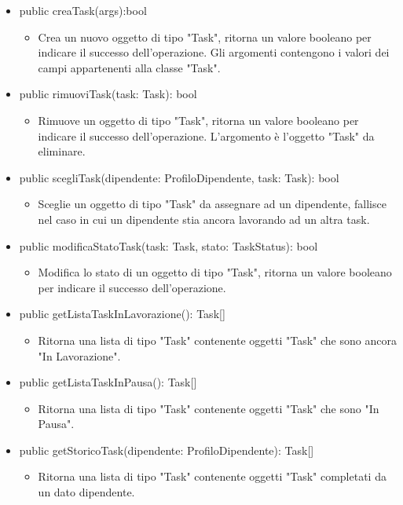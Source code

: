 \documentclass{report}
\begin{document}
\begin{itemize}
\item public creaTask(args):bool
\begin{itemize}
    \item Crea un nuovo oggetto di tipo "Task", ritorna un valore booleano per indicare il successo dell'operazione. Gli argomenti contengono i valori dei campi appartenenti alla classe "Task". 
\end{itemize}
\item public rimuoviTask(task: Task): bool
\begin{itemize}
    \item Rimuove un oggetto di tipo "Task", ritorna un valore booleano per indicare il successo dell'operazione. L'argomento è l'oggetto "Task" da eliminare.
\end{itemize}
\item public scegliTask(dipendente: ProfiloDipendente, task: Task): bool
\begin{itemize}
    \item Sceglie un oggetto di tipo "Task" da assegnare ad un dipendente, fallisce nel caso in cui un dipendente stia ancora lavorando ad un altra task.
\end{itemize}
\item public modificaStatoTask(task: Task, stato: TaskStatus): bool
\begin{itemize}
    \item Modifica lo stato di un oggetto di tipo "Task", ritorna un valore booleano per indicare il successo dell'operazione.
\end{itemize}
\item public getListaTaskInLavorazione(): Task[]
\begin{itemize}
    \item Ritorna una lista di tipo "Task" contenente oggetti "Task" che sono ancora "In Lavorazione".
\end{itemize}
\item public getListaTaskInPausa(): Task[]
\begin{itemize}
    \item Ritorna una lista di tipo "Task" contenente oggetti "Task" che sono "In Pausa".
\end{itemize}
\item public getStoricoTask(dipendente: ProfiloDipendente): Task[]
\begin{itemize}
    \item Ritorna una lista di tipo "Task" contenente oggetti "Task" completati da un dato dipendente.

\end{itemize}
\end{itemize}
\end{document}

